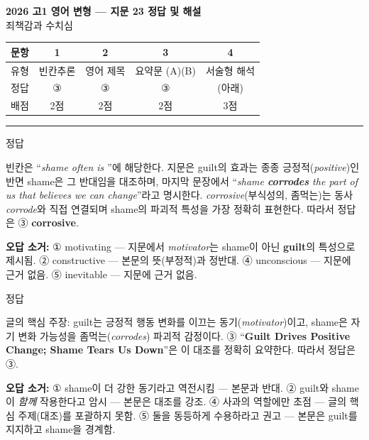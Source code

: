 \documentclass[11pt,a4paper]{article}
\newcommand{\sol}[2]{\vspace{6pt}{\sffamily\bfseries #1} \quad 정답 \fbox{#2}\par\vspace{1pt}}
\begin{document}
\begin{center}
{\fontsize{15}{17}\selectfont\sffamily\bfseries 2026 고1 영어 변형 — 지문 23 정답 및 해설}\\[2pt]
{\sffamily 죄책감과 수치심}
\end{center}
\vspace{6pt}

\begin{center}
\renewcommand{\arraystretch}{1.4}
\begin{tabular}{|c|c|c|c|c|}
\hline
\sffamily 문항 & 1 & 2 & 3 & 4 \\\hline
\sffamily 유형 & \sffamily 빈칸추론 & \sffamily 영어 제목 & \sffamily 요약문 (A)(B) & \sffamily 서술형 해석 \\\hline
\sffamily 정답 & ③ & ③ & ③ & (아래) \\\hline
\sffamily 배점 & 2점 & 2점 & 2점 & 3점 \\\hline
\end{tabular}
\end{center}
\vspace{8pt}\hrule\vspace{4pt}

\sol{1. 빈칸추론}{③}
빈칸은 ``\textit{shame often is \underline{\hspace{2cm}}}''에 해당한다. 지문은 guilt의 효과는 종종 긍정적(\textit{positive})인 반면 shame은 그 반대임을 대조하며, 마지막 문장에서 ``\textit{shame \textbf{corrodes} the part of us that believes we can change}''라고 명시한다. \textit{corrosive}(부식성의, 좀먹는)는 동사 \textit{corrode}와 직접 연결되며 shame의 파괴적 특성을 가장 정확히 표현한다. 따라서 정답은 ③ \textbf{corrosive}.
\par\vspace{3pt}
\textbf{오답 소거:} ① motivating — 지문에서 \textit{motivator}는 shame이 아닌 \textbf{guilt}의 특성으로 제시됨. ② constructive — 본문의 뜻(부정적)과 정반대. ④ unconscious — 지문에 근거 없음. ⑤ inevitable — 지문에 근거 없음.

\sol{2. 영어 제목}{③}
글의 핵심 주장: guilt는 긍정적 행동 변화를 이끄는 동기(\textit{motivator})이고, shame은 자기 변화 가능성을 좀먹는(\textit{corrodes}) 파괴적 감정이다. ③ ``\textbf{Guilt Drives Positive Change; Shame Tears Us Down}''은 이 대조를 정확히 요약한다. 따라서 정답은 ③.
\par\vspace{3pt}
\textbf{오답 소거:} ① shame이 더 강한 동기라고 역전시킴 — 본문과 반대. ② guilt와 shame이 \textit{함께} 작용한다고 암시 — 본문은 대조를 강조. ④ 사과의 역할에만 초점 — 글의 핵심 주제(대조)를 포괄하지 못함. ⑤ 둘을 동등하게 수용하라고 권고 — 본문은 guilt를 지지하고 shame을 경계함.
\end{document}
